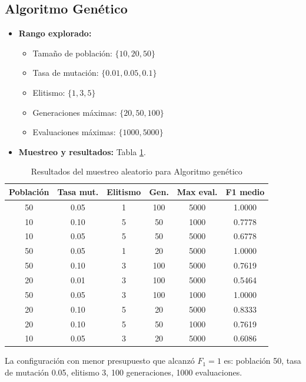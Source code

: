 \documentclass[letterpaper, 12pt]{report}
\begin{document}
\subsection{Algoritmo Genético}

\begin{itemize}
    \item \textbf{Rango explorado:}
    \begin{itemize}
        \item Tamaño de población: \(\{10, 20, 50\}\)
        \item Tasa de mutación: \(\{0.01, 0.05, 0.1\}\)
        \item Elitismo: \(\{1, 3, 5\}\)
        \item Generaciones máximas: \(\{20, 50, 100\}\)
        \item Evaluaciones máximas: \(\{1000, 5000\}\)
    \end{itemize}
    \item \textbf{Muestreo y resultados:} Tabla \ref{tab:ga_results}.
\end{itemize}

\begin{table}[H]
\centering
\caption{Resultados del muestreo aleatorio para Algoritmo genético}
\label{tab:ga_results}
\begin{tabular}{cccccc}
\toprule
\textbf{Población} & \textbf{Tasa mut.} & \textbf{Elitismo} & \textbf{Gen.} & \textbf{Max eval.} & \textbf{F1 medio} \\
\midrule
50 & 0.05 & 1 & 100 & 5000 & 1.0000 \\
10 & 0.10 & 5 & 50 & 1000 & 0.7778 \\
10 & 0.05 & 5 & 50 & 5000 & 0.6778 \\
50 & 0.05 & 1 & 20 & 5000 & 1.0000 \\
50 & 0.10 & 3 & 100 & 5000 & 0.7619 \\
20 & 0.01 & 3 & 100 & 5000 & 0.5464 \\
50 & 0.05 & 3 & 100 & 1000 & 1.0000 \\
20 & 0.10 & 5 & 20 & 5000 & 0.8333 \\
20 & 0.10 & 5 & 50 & 1000 & 0.7619 \\
10 & 0.05 & 3 & 20 & 5000 & 0.6086 \\
\bottomrule
\end{tabular}
\end{table}

La configuración con menor presupuesto que alcanzó \(F_1 = 1\) es:
población 50, tasa de mutación 0.05, elitismo 3, 100 generaciones, 1000 evaluaciones.
\end{document}
